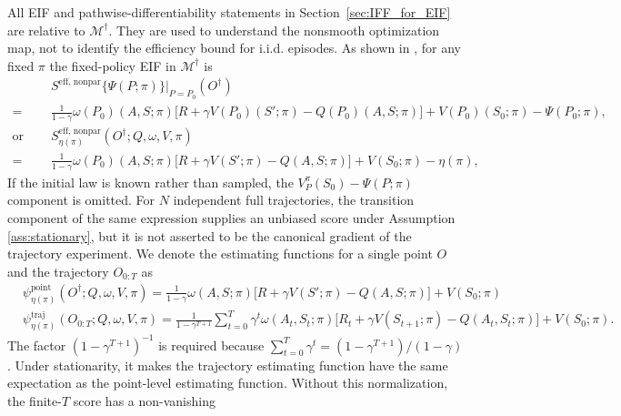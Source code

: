 \documentclass[12pt]{article}
\theoremstyle{remark}\newtheorem{remark}[theorem]{Remark}\theoremstyle{plain}
\newcommand{\EIF}{S^{\text{eff, nonpar}}}
\newcommand{\EstFunTraj}{{\psi}^{\text{traj}}}
\newcommand{\EstFunPoi}{{\psi}^{\text{point}}}
\begin{document}
All EIF and pathwise-differentiability statements in
Section~\ref{sec:IFF_for_EIF} are relative to
$\mathcal M^\dagger$.  They are used to understand the nonsmooth
optimization map, not to identify the efficiency bound for i.i.d.
episodes.  As shown in
\cite{uehara2020minimax,shi2024off,shi2021deeply}, for any fixed
$\pi$ the fixed-policy EIF in $\mathcal M^\dagger$ is
\begin{equation}\label{eq:EIF_for_fixed_policy}
    \begin{aligned}
        & \EIF \{ \Psi(P; \pi)\}\Big|_{P = P_0}(O^\dagger) \\
        = & \frac{1}{1 - \gamma}  \omega(P_0)(A, S; \pi)\big[ R + \gamma V(P_0)(S'; \pi) - Q(P_0)(A, S; \pi)\big] + V(P_0)(S_0; \pi) - \Psi(P_0; \pi), \\
        \text{or } \quad & \EIF_{\eta(\pi)}(O^\dagger; Q, \omega, V, \pi) \\
        =& \frac{1}{1 - \gamma} \omega(P_0)(A, S; \pi) \big[ R + \gamma V(S'; \pi) - Q(A, S; \pi)\big] + V(S_0; \pi) - \eta(\pi),
    \end{aligned}
\end{equation}
If the initial law is known rather than sampled, the
$V_P^\pi(S_0)-\Psi(P;\pi)$ component is omitted.
For $N$ independent full trajectories, the transition component of
the same expression supplies an unbiased score under Assumption
\ref{ass:stationary}, but it is not asserted to be the canonical
gradient of the trajectory experiment.
We denote the estimating functions for a single point $O$ and the trajectory $O_{0:T}$ as
\begin{equation}\label{eq:debiased_terms_for_fixed_policy}
    \begin{aligned}
        & \EstFunPoi_{\eta(\pi)}(O^\dagger; Q, \omega, V, \pi) = \frac{1}{1 - \gamma}  \omega(A, S; \pi) \big[ R + \gamma V(S'; \pi) - Q(A, S; \pi)\big] + V(S_0; \pi) \\
        & \EstFunTraj_{\eta(\pi)}(O_{0:T}; Q, \omega, V, \pi)
        = \frac{1}{1-\gamma^{T+1}}\sum_{t = 0}^T \gamma^t
        \omega(A_t, S_t; \pi)
        \big[ R_t + \gamma V(S_{t + 1}; \pi)
        - Q(A_t, S_t; \pi)\big] + V(S_0; \pi).
    \end{aligned}
\end{equation}
The factor $(1-\gamma^{T+1})^{-1}$ is required because
$\sum_{t=0}^T\gamma^t=(1-\gamma^{T+1})/(1-\gamma)$.
Under stationarity, it makes the trajectory estimating function have
the same expectation as the point-level estimating function.  Without
this normalization, the finite-$T$ score has a non-vanishing
\end{document}
